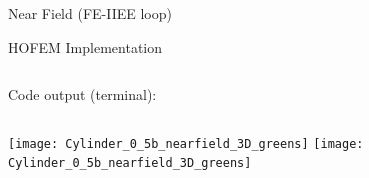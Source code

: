 \begin{frame}[allowframebreaks]{Near Field (FE-IIEE loop)}
\begin{block}{HOFEM Implementation}
    \begin{columns}%
      
      
      
    \end{columns}
  \end{block}



  \framebreak %

 Code output (terminal):
  
 


  \framebreak %


  \begin{columns}
     \centering
    {\texttt{[image: Cylinder\_0\_5b\_nearfield\_3D\_greens]}}
     \centering
    {\texttt{[image: Cylinder\_0\_5b\_nearfield\_3D\_greens]}}
  \end{columns}    

  
\end{frame}



